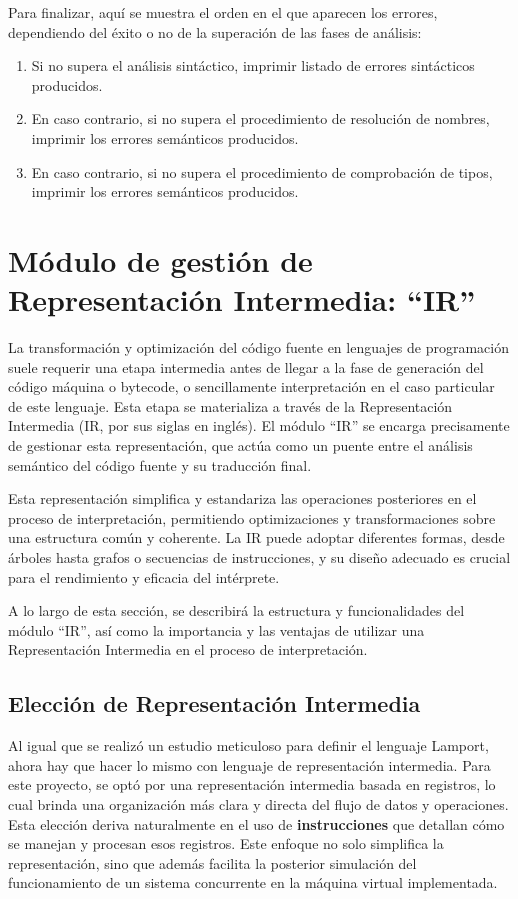 \vspace{0.5cm}
Para finalizar, aquí se muestra el orden en el que aparecen los errores, dependiendo del éxito o no de la superación de las fases de análisis:

\begin{enumerate}
    \item Si no supera el análisis sintáctico, imprimir listado de errores sintácticos producidos.
    \item En caso contrario, si no supera el procedimiento de resolución de nombres, imprimir los errores semánticos producidos.
    \item En caso contrario, si no supera el procedimiento de comprobación de tipos, imprimir los errores semánticos producidos.
\end{enumerate}

\section{Módulo de gestión de Representación Intermedia: ``IR''}\label{sec:implementacionIR}
La transformación y optimización del código fuente en lenguajes de programación suele requerir una etapa intermedia antes de llegar a la fase de generación del código máquina o bytecode, o sencillamente interpretación en el caso particular de este lenguaje. Esta etapa se materializa a través de la Representación Intermedia (IR, por sus siglas en inglés). El módulo ``IR'' se encarga precisamente de gestionar esta representación, que actúa como un puente entre el análisis semántico del código fuente y su traducción final.

\vspace{0.5cm}
Esta representación simplifica y estandariza las operaciones posteriores en el proceso de interpretación, permitiendo optimizaciones y transformaciones sobre una estructura común y coherente. La IR puede adoptar diferentes formas, desde árboles hasta grafos o secuencias de instrucciones, y su diseño adecuado es crucial para el rendimiento y eficacia del intérprete.

\vspace{0.5cm}
A lo largo de esta sección, se describirá la estructura y funcionalidades del módulo ``IR'', así como la importancia y las ventajas de utilizar una Representación Intermedia en el proceso de interpretación.

\subsection{Elección de Representación Intermedia}
Al igual que se realizó un estudio meticuloso para definir el lenguaje Lamport, ahora hay que hacer lo mismo con lenguaje de representación intermedia. Para este proyecto, se optó por una representación intermedia basada en registros, lo cual brinda una organización más clara y directa del flujo de datos y operaciones. Esta elección deriva naturalmente en el uso de \textbf{instrucciones} que detallan cómo se manejan y procesan esos registros. Este enfoque no solo simplifica la representación, sino que además facilita la posterior simulación del funcionamiento de un sistema concurrente en la máquina virtual implementada.

